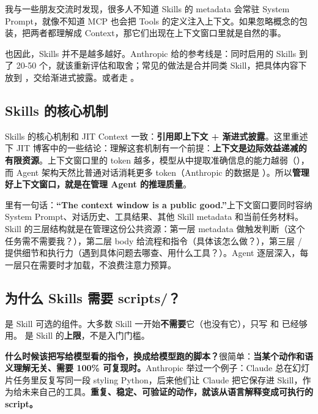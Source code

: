 \begin{tipbox}
我与一些朋友交流时发现，很多人不知道 Skills 的 metadata 会常驻 System Prompt，就像不知道 MCP 也会把 Tools 的定义注入上下文。如果忽略概念的包装，把两者都理解成 Context，那它们出现在上下文窗口里就是自然的事。

也因此，Skills 并不是越多越好。Anthropic 给的参考线是：同时启用的 Skills 到了 20-50 个，就该重新评估和取舍；常见的做法是合并同类 Skill，把具体内容下放到 ，交给渐进式披露。或者走 。
\end{tipbox}

\subsection{Skills 的核心机制}

Skills 的核心机制和 JIT Context 一致：\textbf{引用即上下文 + 渐进式披露}。这里重述下 JIT 博客中的一些结论：理解这套机制有一个前提：\textbf{上下文是边际效益递减的有限资源}。上下文窗口里的 token 越多，模型从中提取准确信息的能力越弱（），而 Agent 架构天然比普通对话消耗更多 token（Anthropic 的数据是 ）。所以\textbf{管理好上下文窗口，就是在管理 Agent 的推理质量}。

 里有一句话：\textbf{“The context window is a public good.”}上下文窗口要同时容纳 System Prompt、对话历史、工具结果、其他 Skill metadata 和当前任务材料。Skill 的三层结构就是在管理这份公共资源：第一层 metadata 做触发判断（这个任务需不需要我？），第二层 body 给流程和指令（具体该怎么做？），第三层  /  提供细节和执行力（遇到具体问题去哪查、用什么工具？）。Agent 逐层深入，每一层只在需要时才加载，不浪费注意力预算。

\subsection{为什么 Skills 需要 scripts/？}

 是 Skill 可选的组件。大多数 Skill 一开始\textbf{不需要}它（也没有它），只写  和  已经够用。 是 Skill 的\textbf{上限}，不是入门门槛。

\textbf{什么时候该把写给模型看的指令，换成给模型跑的脚本？}很简单：\textbf{当某个动作和语义理解无关、需要 100\% 可复现时。}Anthropic 举过一个例子：Claude 总在幻灯片任务里反复写同一段 styling Python，后来他们让 Claude 把它保存进 Skill，作为给未来自己的工具。\textbf{重复、稳定、可验证的动作，就该从语言解释变成可执行的 script。}

